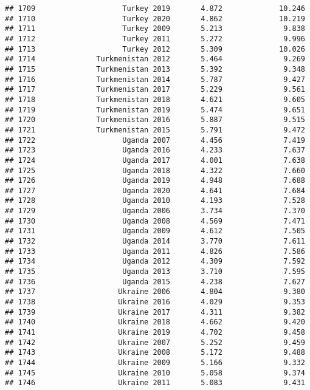 \documentclass[
]{article}
\begin{document}
\begin{verbatim}
## 1709                    Turkey 2019       4.872             10.246
## 1710                    Turkey 2020       4.862             10.219
## 1711                    Turkey 2009       5.213              9.838
## 1712                    Turkey 2011       5.272              9.996
## 1713                    Turkey 2012       5.309             10.026
## 1714              Turkmenistan 2012       5.464              9.269
## 1715              Turkmenistan 2013       5.392              9.348
## 1716              Turkmenistan 2014       5.787              9.427
## 1717              Turkmenistan 2017       5.229              9.561
## 1718              Turkmenistan 2018       4.621              9.605
## 1719              Turkmenistan 2019       5.474              9.651
## 1720              Turkmenistan 2016       5.887              9.515
## 1721              Turkmenistan 2015       5.791              9.472
## 1722                    Uganda 2007       4.456              7.419
## 1723                    Uganda 2016       4.233              7.637
## 1724                    Uganda 2017       4.001              7.638
## 1725                    Uganda 2018       4.322              7.660
## 1726                    Uganda 2019       4.948              7.688
## 1727                    Uganda 2020       4.641              7.684
## 1728                    Uganda 2010       4.193              7.528
## 1729                    Uganda 2006       3.734              7.370
## 1730                    Uganda 2008       4.569              7.471
## 1731                    Uganda 2009       4.612              7.505
## 1732                    Uganda 2014       3.770              7.611
## 1733                    Uganda 2011       4.826              7.586
## 1734                    Uganda 2012       4.309              7.592
## 1735                    Uganda 2013       3.710              7.595
## 1736                    Uganda 2015       4.238              7.627
## 1737                   Ukraine 2006       4.804              9.380
## 1738                   Ukraine 2016       4.029              9.353
## 1739                   Ukraine 2017       4.311              9.382
## 1740                   Ukraine 2018       4.662              9.420
## 1741                   Ukraine 2019       4.702              9.458
## 1742                   Ukraine 2007       5.252              9.459
## 1743                   Ukraine 2008       5.172              9.488
## 1744                   Ukraine 2009       5.166              9.332
## 1745                   Ukraine 2010       5.058              9.374
## 1746                   Ukraine 2011       5.083              9.431

\end{verbatim}
\end{document}
